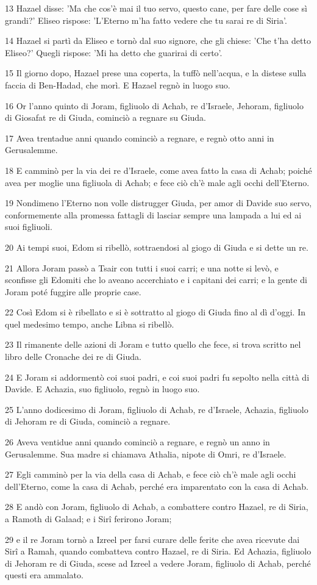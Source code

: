 \par 13 Hazael disse: 'Ma che cos'è mai il tuo servo, questo cane, per fare delle cose sì grandi?' Eliseo rispose: 'L'Eterno m'ha fatto vedere che tu sarai re di Siria'.
\par 14 Hazael si partì da Eliseo e tornò dal suo signore, che gli chiese: 'Che t'ha detto Eliseo?' Quegli rispose: 'Mi ha detto che guarirai di certo'.
\par 15 Il giorno dopo, Hazael prese una coperta, la tuffò nell'acqua, e la distese sulla faccia di Ben-Hadad, che morì. E Hazael regnò in luogo suo.
\par 16 Or l'anno quinto di Joram, figliuolo di Achab, re d'Israele, Jehoram, figliuolo di Giosafat re di Giuda, cominciò a regnare su Giuda.
\par 17 Avea trentadue anni quando cominciò a regnare, e regnò otto anni in Gerusalemme.
\par 18 E camminò per la via dei re d'Israele, come avea fatto la casa di Achab; poiché avea per moglie una figliuola di Achab; e fece ciò ch'è male agli occhi dell'Eterno.
\par 19 Nondimeno l'Eterno non volle distrugger Giuda, per amor di Davide suo servo, conformemente alla promessa fattagli di lasciar sempre una lampada a lui ed ai suoi figliuoli.
\par 20 Ai tempi suoi, Edom si ribellò, sottraendosi al giogo di Giuda e si dette un re.
\par 21 Allora Joram passò a Tsair con tutti i suoi carri; e una notte si levò, e sconfisse gli Edomiti che lo aveano accerchiato e i capitani dei carri; e la gente di Joram poté fuggire alle proprie case.
\par 22 Così Edom si è ribellato e si è sottratto al giogo di Giuda fino al dì d'oggi. In quel medesimo tempo, anche Libna si ribellò.
\par 23 Il rimanente delle azioni di Joram e tutto quello che fece, si trova scritto nel libro delle Cronache dei re di Giuda.
\par 24 E Joram si addormentò coi suoi padri, e coi suoi padri fu sepolto nella città di Davide. E Achazia, suo figliuolo, regnò in luogo suo.
\par 25 L'anno dodicesimo di Joram, figliuolo di Achab, re d'Israele, Achazia, figliuolo di Jehoram re di Giuda, cominciò a regnare.
\par 26 Aveva ventidue anni quando cominciò a regnare, e regnò un anno in Gerusalemme. Sua madre si chiamava Athalia, nipote di Omri, re d'Israele.
\par 27 Egli camminò per la via della casa di Achab, e fece ciò ch'è male agli occhi dell'Eterno, come la casa di Achab, perché era imparentato con la casa di Achab.
\par 28 E andò con Joram, figliuolo di Achab, a combattere contro Hazael, re di Siria, a Ramoth di Galaad; e i Sirî ferirono Joram;
\par 29 e il re Joram tornò a Izreel per farsi curare delle ferite che avea ricevute dai Sirî a Ramah, quando combatteva contro Hazael, re di Siria. Ed Achazia, figliuolo di Jehoram re di Giuda, scese ad Izreel a vedere Joram, figliuolo di Achab, perché questi era ammalato.

